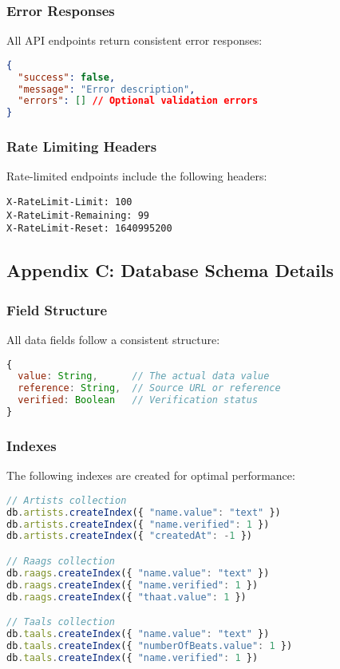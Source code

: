 \documentclass[12pt,a4paper]{article}
\begin{document}
\subsubsection{Error Responses}
All API endpoints return consistent error responses:

\begin{lstlisting}[language=JSON]
{
  "success": false,
  "message": "Error description",
  "errors": [] // Optional validation errors
}
\end{lstlisting}

\subsubsection{Rate Limiting Headers}
Rate-limited endpoints include the following headers:

\begin{lstlisting}[language=HTTP]
X-RateLimit-Limit: 100
X-RateLimit-Remaining: 99
X-RateLimit-Reset: 1640995200
\end{lstlisting}

\subsection{Appendix C: Database Schema Details}

\subsubsection{Field Structure}
All data fields follow a consistent structure:

\begin{lstlisting}[language=JavaScript]
{
  value: String,      // The actual data value
  reference: String,  // Source URL or reference
  verified: Boolean   // Verification status
}
\end{lstlisting}

\subsubsection{Indexes}
The following indexes are created for optimal performance:

\begin{lstlisting}[language=JavaScript]
// Artists collection
db.artists.createIndex({ "name.value": "text" })
db.artists.createIndex({ "name.verified": 1 })
db.artists.createIndex({ "createdAt": -1 })

// Raags collection
db.raags.createIndex({ "name.value": "text" })
db.raags.createIndex({ "name.verified": 1 })
db.raags.createIndex({ "thaat.value": 1 })

// Taals collection
db.taals.createIndex({ "name.value": "text" })
db.taals.createIndex({ "numberOfBeats.value": 1 })
db.taals.createIndex({ "name.verified": 1 })
\end{lstlisting}
\end{document}
